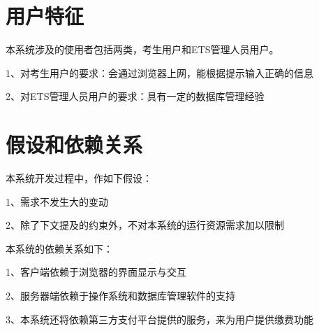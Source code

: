 \section{用户特征}
本系统涉及的使用者包括两类，考生用户和ETS管理人员用户。

1、对考生用户的要求：会通过浏览器上网，能根据提示输入正确的信息

2、对ETS管理人员用户的要求：具有一定的数据库管理经验

\section{假设和依赖关系}
本系统开发过程中，作如下假设：

1、需求不发生大的变动

2、除了下文提及的约束外，不对本系统的运行资源需求加以限制

本系统的依赖关系如下：

1、客户端依赖于浏览器的界面显示与交互

2、服务器端依赖于操作系统和数据库管理软件的支持

3、本系统还将依赖第三方支付平台提供的服务，来为用户提供缴费功能
